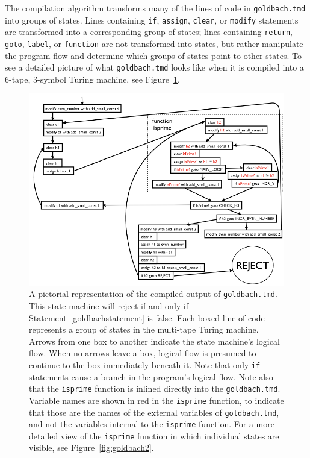 The compilation algorithm transforms many of the lines of code in \texttt{goldbach.tmd} into groups of states. Lines containing \texttt{if}, \texttt{assign}, \texttt{clear}, or \texttt{modify} statements are transformed into a corresponding group of states; lines containing \texttt{return}, \texttt{goto}, \texttt{label}, or \texttt{function} are not transformed into states, but rather manipulate the program flow and determine which groups of states point to other states. To see a detailed picture of what \texttt{goldbach.tmd} looks like when it is compiled into a 6-tape, 3-symbol Turing machine, see Figure~\ref{fig:goldbach1}.

\begin{figure} 
\begin{center} 
\includegraphics[scale=0.4]{figs/goldbach1.png} 
\caption{A pictorial representation of the compiled output of \texttt{goldbach.tmd}. This state machine will reject if and only if Statement~\ref{goldbachstatement} is false. Each boxed line of code represents a group of states in the multi-tape Turing machine. Arrows from one box to another indicate the state machine's logical flow. When no arrows leave a box, logical flow is presumed to continue to the box immediately beneath it. Note that only \texttt{if} statements cause a branch in the program's logical flow. Note also that the \texttt{isprime} function is inlined directly into the \texttt{goldbach.tmd}. Variable names are shown in red in the \texttt{isprime} function, to indicate that those are the names of the external variables of \texttt{goldbach.tmd}, and not the variables internal to the \texttt{isprime} function. For a more detailed view of the \texttt{isprime} function in which individual states are visible, see Figure~\ref{fig:goldbach2}. \label{fig:goldbach1}}
\end{center} 
\end{figure}

